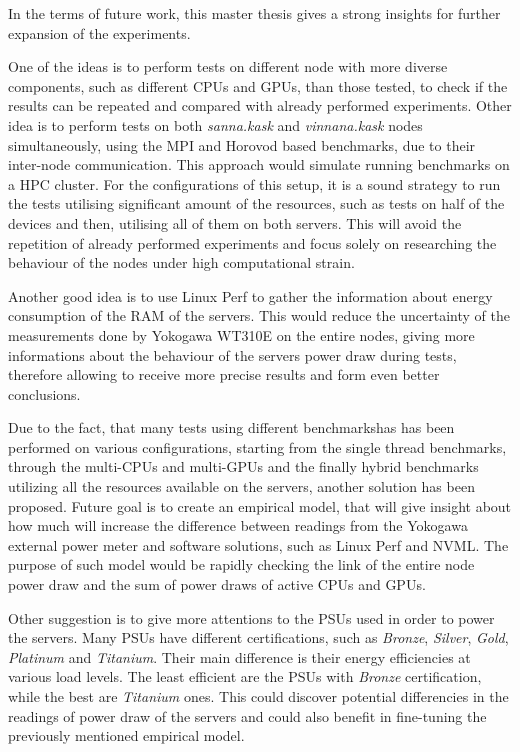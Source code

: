 In the terms of future work, this master thesis gives a strong insights for
further expansion of the experiments.

One of the ideas is to perform tests
on different node with more diverse components, such as different CPUs and
GPUs, than those tested, to check if the results can be repeated and compared
with already performed experiments. Other idea is to perform tests on both 
\emph{sanna.kask} and \emph{vinnana.kask} nodes simultaneously, using the
MPI and Horovod based benchmarks, due to their inter-node communication.
This approach would simulate running benchmarks on a HPC cluster. For
the configurations of this setup, it is a sound strategy to run the tests
utilising significant amount of the resources, such as tests on half of the
devices and then, utilising all of them on both servers. This will avoid
the repetition of already performed experiments and focus solely on
researching the behaviour of the nodes under high computational strain.

Another good idea is to use Linux Perf to gather the information about energy
consumption of the RAM of the servers. This would reduce the uncertainty of
the measurements done by Yokogawa WT310E on the entire nodes, giving more
informations about the behaviour of the servers power draw during tests,
therefore allowing to receive more precise results and form even better
conclusions.

Due to the fact, that many tests using different benchmarkshas has been
performed on various configurations, starting from the single thread benchmarks,
through the multi-CPUs and multi-GPUs and the finally hybrid benchmarks
utilizing all the resources available on the servers, another solution has been
proposed. Future goal is to create an empirical model, that will give insight
about how much will increase the difference between readings from the Yokogawa
external power meter and software solutions, such as Linux Perf and NVML\@.
The purpose of such model would be rapidly checking the link of the 
entire node power draw and the sum of power draws of active CPUs and GPUs.

Other suggestion is to give more attentions to the PSUs used in order to
power the servers. Many PSUs have different certifications, such as
\emph{Bronze}, \emph{Silver}, \emph{Gold}, \emph{Platinum} and \emph{Titanium}.
Their main difference is their energy efficiencies at various load levels.
The least efficient are the PSUs with \emph{Bronze} certification, while the
best are \emph{Titanium} ones. This could discover potential differencies
in the readings of power draw of the servers and could also benefit in
fine-tuning the previously mentioned empirical model.

